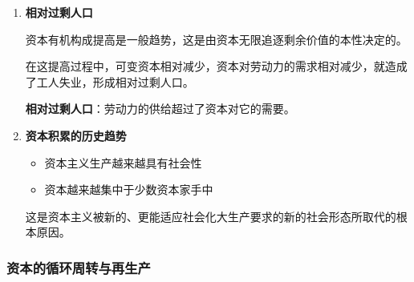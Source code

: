 \documentclass[12pt, a4paper, oneside]{ctexart}
\begin{document}
\begin{enumerate}
  \item {\bf 相对过剩人口}
  
  资本有机构成提高是一般趋势，这是由资本无限追逐剩余价值的本性决定的。

  在这提高过程中，可变资本相对减少，资本对劳动力的需求相对减少，就造成了工人失业，形成相对过剩人口。

  \textbf{相对过剩人口}：劳动力的供给超过了资本对它的需要。

  \item {\bf 资本积累的历史趋势}
  
  \begin{itemize}
    \item 资本主义生产越来越具有社会性
    \item 资本越来越集中于少数资本家手中
  \end{itemize}

  这是资本主义被新的、更能适应社会化大生产要求的新的社会形态所取代的根本原因。
\end{enumerate}

\subsubsection{资本的循环周转与再生产}
\end{document}
